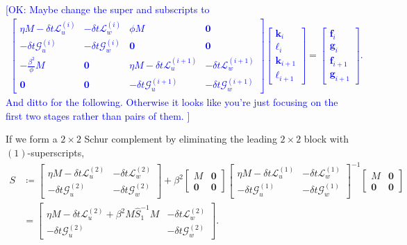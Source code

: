 \documentclass[review]{siamart}
\newcommand{\OK}[1]{\textcolor{blue}{[OK: #1]}}
\begin{document}
\OK{Maybe change the super and subscripts to
\begin{align}
\begin{bmatrix} \eta M - \delta t\mathcal{L}_{u}^{(i)} & -\delta t\mathcal{L}_{w}^{(i)}
		& \phi M & \mathbf{0} \\
	-\delta t\mathcal{G}_{u}^{(i)} & -\delta t\mathcal{G}_w^{(i)}
		& \mathbf{0} & \mathbf{0} \\
	-\tfrac{\beta^2}{\phi}M & \mathbf{0} & \eta M - \delta t\mathcal{L}_{u}^{(i+1)} &
		-\delta t\mathcal{L}_{w}^{(i+1)} \\
	\mathbf{0} & \mathbf{0} & -\delta t\mathcal{G}_{u}^{(i+1)} &
		-\delta t\mathcal{G}_w^{(i+1)} \end{bmatrix}
	\begin{bmatrix} \mathbf{k}_{i} \\ \boldsymbol{\ell}_{i} \\
		 \mathbf{k}_{i+1} \\ \boldsymbol{\ell}_{i+1} \end{bmatrix}
	= 	\begin{bmatrix} \mathbf{f}_{i} \\ \mathbf{g}_{i} \\
		 \mathbf{f}_{i+1} \\ \mathbf{g}_{i+1} \end{bmatrix}.
\end{align}
And ditto for the following. Otherwise it looks like you're just focusing on the first two stages rather than pairs of them.
}

%
If we form a $2\times 2$ Schur complement by eliminating the leading
$2\times 2$ block with $(1)$-superscripts,
%
\begin{align*}
S & \coloneqq \begin{bmatrix} \eta M - \delta t\mathcal{L}_{u}^{(2)} &
	-\delta t\mathcal{L}_{w}^{(2)} \\ -\delta t\mathcal{G}_{u}^{(2)} &
		-\delta t\mathcal{G}_w^{(2)} \end{bmatrix}
	+ \beta^2 \begin{bmatrix} M & \mathbf{0} \\\mathbf{0} & \mathbf{0} \end{bmatrix}
	\begin{bmatrix} \eta M - \delta t\mathcal{L}_{u}^{(1)} &
	-\delta t\mathcal{L}_{w}^{(1)} \\ -\delta t\mathcal{G}_{u}^{(1)} &
		-\delta t\mathcal{G}_w^{(1)} \end{bmatrix}^{-1}
	\begin{bmatrix} M & \mathbf{0} \\\mathbf{0} & \mathbf{0} \end{bmatrix} \\
& = \begin{bmatrix} \eta M - \delta t\mathcal{L}_{u}^{(2)} + \beta^2M \widehat{S}_1^{-1}M &
	-\delta t\mathcal{L}_{w}^{(2)} \\ -\delta t\mathcal{G}_{u}^{(2)} &
		-\delta t\mathcal{G}_w^{(2)} \end{bmatrix}.
\end{align*}
%
\end{document}
